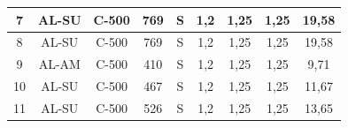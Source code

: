 \begin{table}[htbp]
\begin{tabular}{|c|c|c|c|c|cccc|}
7                                                     & AL-SU                                                      & C-500                                                           & 769                                                                                                              & S                                                         & \multicolumn{1}{c|}{1,2}                                & \multicolumn{1}{c|}{1,25}                               & \multicolumn{1}{c|}{1,25}                               & 19,58                                                           \\ \hline
8                                                     & AL-SU                                                      & C-500                                                           & 769                                                                                                              & S                                                         & \multicolumn{1}{c|}{1,2}                                & \multicolumn{1}{c|}{1,25}                               & \multicolumn{1}{c|}{1,25}                               & 19,58                                                           \\ \hline
9                                                     & AL-AM                                                      & C-500                                                           & 410                                                                                                              & S                                                         & \multicolumn{1}{c|}{1,2}                                & \multicolumn{1}{c|}{1,25}                               & \multicolumn{1}{c|}{1,25}                               & 9,71                                                            \\ \hline
10                                                    & AL-SU                                                      & C-500                                                           & 467                                                                                                              & S                                                         & \multicolumn{1}{c|}{1,2}                                & \multicolumn{1}{c|}{1,25}                               & \multicolumn{1}{c|}{1,25}                               & 11,67                                                           \\ \hline
11                                                    & AL-SU                                                      & C-500                                                           & 526                                                                                                              & S                                                         & \multicolumn{1}{c|}{1,2}                                & \multicolumn{1}{c|}{1,25}                               & \multicolumn{1}{c|}{1,25}                               & 13,65                                                           \\ \hline

\end{tabular}
\end{table}
